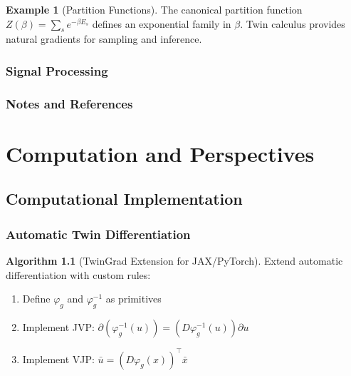 \documentclass[11pt,twoside]{book}
\theoremstyle{plain}
\theoremstyle{definition}
\newtheorem{example}[theorem]{Example}
\newtheorem{algorithm_def}[theorem]{Algorithm}
\theoremstyle{remark}
\begin{document}
\begin{example}[Partition Functions]
    The canonical partition function $Z(\beta) = \sum_s e^{-\beta E_s}$ defines an exponential family in $\beta$. Twin calculus provides natural gradients for sampling and inference.
\end{example}

\section{Signal Processing}
\label{sec:signal}

\section{Notes and References}
\label{sec:ch17_notes}


\part{Computation and Perspectives}
\label{part:computation}


\chapter{Computational Implementation}
\label{ch:implementation}

\section{Automatic Twin Differentiation}
\label{sec:auto_diff}

\begin{algorithm_def}[TwinGrad Extension for JAX/PyTorch]
    Extend automatic differentiation with custom rules:
    \begin{enumerate}
        \item Define $\varphi_g$ and $\varphi_g^{-1}$ as primitives
        \item Implement JVP: $\partial(\varphi_g^{-1}(u)) = (D\varphi_g^{-1}(u)) \partial u$
        \item Implement VJP: $\bar{u} = (D\varphi_g(x))^\top \bar{x}$
    \end{enumerate}
\end{algorithm_def}
\end{document}
